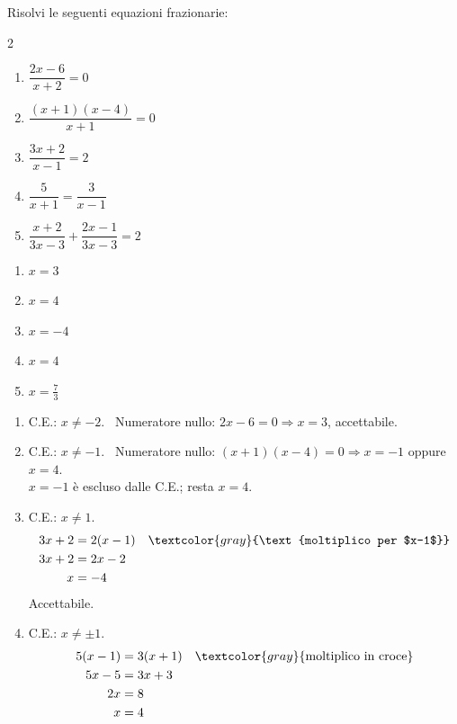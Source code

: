 \begin{question}[ID=3.3, subtitle={Equazioni frazionarie}, difficulty=facile, tags={equazioni frazionarie}]
Risolvi le seguenti equazioni frazionarie:
\begin{multicols}{2}
\begin{enumerate}[leftmargin=3cm]
    \item $\dfrac{2x-6}{x+2} = 0$
    \item $\dfrac{(x+1)(x-4)}{x+1} = 0$
    \item $\dfrac{3x+2}{x-1} = 2$
    \item $\dfrac{5}{x+1} = \dfrac{3}{x-1}$
    \item $\dfrac{x+2}{3x-3} + \dfrac{2x-1}{3x-3} = 2$
\end{enumerate}
\end{multicols}
\begin{solution}
\begin{enumerate}
    \item $x=3$
    \item $x=4$
    \item $x=-4$
    \item $x=4$
    \item $x=\tfrac73$
\end{enumerate}
\end{solution}
\begin{explanation}
\begin{enumerate}
    \item C.E.: $x\neq-2$. \ Numeratore nullo: $2x-6=0 \Rightarrow x=3$, accettabile.
    \item C.E.: $x\neq-1$. \ Numeratore nullo: $(x+1)(x-4)=0 \Rightarrow x=-1$ oppure $x=4$. \\
    $x=-1$ è escluso dalle C.E.; resta $x=4$.
    \item C.E.: $x\neq1$.
    \[\begin{aligned}
    3x+2 &= 2(x-1) && \textcolor{gray}{\text{moltiplico per $x-1$}}\\
    3x+2 &= 2x-2\\
    x &= -4
    \end{aligned}\]
    Accettabile.
    \item C.E.: $x\neq\pm1$.
    \[\begin{aligned}
    5(x-1) &= 3(x+1) && \textcolor{gray}{\text{moltiplico in croce}}\\
    5x-5 &= 3x+3\\
    2x &= 8\\
    x &= 4
    \end{aligned}\]

\end{enumerate}
\end{explanation}
\end{question}
